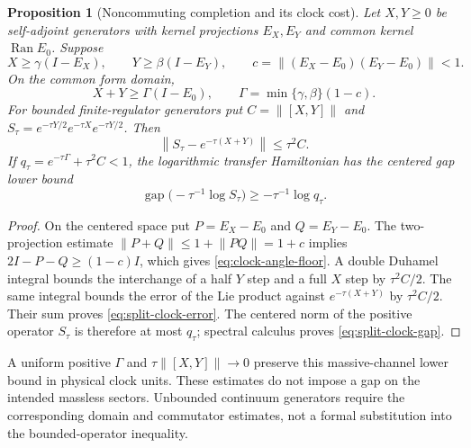 \documentclass[11pt,a4paper,oneside]{book}
\theoremstyle{plain}
\newtheorem{proposition}[theorem]{Proposition}
\theoremstyle{definition}
\theoremstyle{remark}
\newcommand{\Ran}{\operatorname{Ran}}
\newcommand{\norm}[1]{\left\lVert#1\right\rVert}
\newcommand{\src}[2]{\cite{#1}}
\begin{document}
\begin{proposition}[Noncommuting completion and its clock cost]
\label{prop:split-clock}
Let $X,Y\ge0$ be self-adjoint generators with kernel projections $E_X,E_Y$
and common kernel $\Ran E_0$.  Suppose
\[
 X\ge\gamma(I-E_X),\qquad Y\ge\beta(I-E_Y),\qquad
 c=\norm{(E_X-E_0)(E_Y-E_0)}<1.
\]
On the common form domain,
\begin{equation}
 X+Y\ge\Gamma(I-E_0),\qquad
 \Gamma=\min\{\gamma,\beta\}(1-c).
 \label{eq:clock-angle-floor}
\end{equation}
For bounded finite-regulator generators put
$C=\norm{[X,Y]}$ and $S_\tau=e^{-\tau Y/2}e^{-\tau X}e^{-\tau Y/2}$.
Then
\begin{equation}
 \norm{S_\tau-e^{-\tau(X+Y)}}\le\tau^2C.
 \label{eq:split-clock-error}
\end{equation}
If $q_\tau=e^{-\tau\Gamma}+\tau^2C<1$, the logarithmic transfer
Hamiltonian has the centered gap lower bound
\begin{equation}
 \operatorname{gap}\bigl(-\tau^{-1}\log S_\tau\bigr)
 \ge-\tau^{-1}\log q_\tau.
 \label{eq:split-clock-gap}
\end{equation}
\end{proposition}
\begin{proof}
On the centered space put $P=E_X-E_0$ and $Q=E_Y-E_0$.
The two-projection estimate $\norm{P+Q}\le1+\norm{PQ}=1+c$ implies
$2I-P-Q\ge(1-c)I$, which gives \eqref{eq:clock-angle-floor}.
A double Duhamel integral bounds the interchange of a half $Y$ step and
a full $X$ step by $\tau^2C/2$.  The same integral bounds the error of
the Lie product against $e^{-\tau(X+Y)}$ by $\tau^2C/2$.
Their sum proves \eqref{eq:split-clock-error}.  The centered norm of the
positive operator $S_\tau$ is therefore at most $q_\tau$; spectral
calculus proves \eqref{eq:split-clock-gap}.
\end{proof}
\src{R14}{lem:v14v97-angle,thm:v14v97-split}

A uniform positive $\Gamma$ and $\tau\norm{[X,Y]}\to0$ preserve this
massive-channel lower bound in physical clock units.  These estimates do
not impose a gap on the intended massless sectors.  Unbounded continuum
generators require the corresponding domain and commutator estimates,
not a formal substitution into the bounded-operator inequality.
\end{document}
